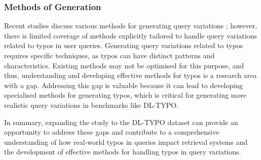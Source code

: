 \subsubsection{Methods of Generation}
Recent studies discuss various methods for generating query variations \cite{lu, bailey, benham}; however, there is limited coverage of methods explicitly tailored to handle query variations related to typos in user queries.
Generating query variations related to typos requires specific techniques, as typos can have distinct patterns and characteristics. Existing methods may not be optimised for this purpose, and thus, understanding and developing effective methods for typos is a research area with a gap.
Addressing this gap is valuable because it can lead to developing specialised methods for generating typos, which is critical for generating more realistic query variations in benchmarks like DL-TYPO.

In summary, expanding the study to the DL-TYPO dataset can provide an opportunity to address these gaps and contribute to a comprehensive understanding of how real-world typos in queries impact retrieval systems and the development of effective methods for handling typos in query variations.